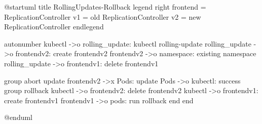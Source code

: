 @startuml
title RollingUpdates-Rollback
legend right
  frontend = ReplicationController
  v1 = old ReplicationController
  v2 = new ReplicationController
endlegend

autonumber
kubectl ->o rolling_update: kubectl rolling-update
rolling_update ->o frontendv2: create frontendv2
frontendv2 ->o namespace: existing namespace
rolling_update ->o frontendv1: delete frontendv1

group abort update
  frontendv2 ->x Pods: update
  Pods ->o kubectl: success
  group rollback
    kubectl ->o frontendv2: delete frontendv2
    kubectl ->o frontendv1: create frontendv1
    frontendv1 ->o pods: run rollback
    end
end

@enduml
